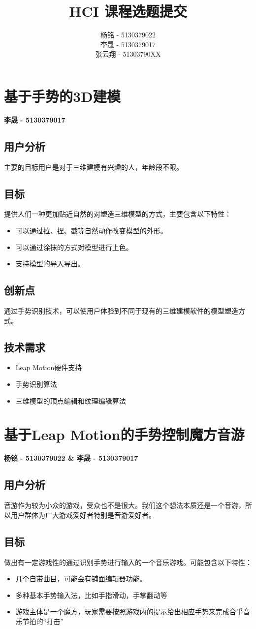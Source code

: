 \documentclass{article} \usepackage{CJK}
\author{杨铭 - 5130379022\\
        李晟 - 5130379017\\
        张云翔 - 51303790XX}
\title{HCI 课程选题提交}
\begin{document}
\maketitle
\newpage
\section{基于手势的3D建模}
\textbf{李晟 - 5130379017}
\subsection{用户分析}
主要的目标用户是对于三维建模有兴趣的人，年龄段不限。
\subsection{目标}
提供人们一种更加贴近自然的对塑造三维模型的方式，主要包含以下特性：
\begin{itemize}
	\item 可以通过拉、捏、戳等自然动作改变模型的外形。
	\item 可以通过涂抹的方式对模型进行上色。
	\item 支持模型的导入导出。
\end{itemize}
\subsection{创新点}
通过手势识别技术，可以使用户体验到不同于现有的三维建模软件的模型塑造方式。
\subsection{技术需求}
\begin{itemize}
	\item Leap Motion硬件支持
	\item 手势识别算法
	\item 三维模型的顶点编辑和纹理编辑算法
\end{itemize}
\newpage
\section{基于Leap Motion的手势控制魔方音游}
\textbf{杨铭 - 5130379022 \& 李晟 - 5130379017}
\subsection{用户分析}
音游作为较为小众的游戏，受众也不是很大。我们这个想法本质还是一个音游，所以用户群体为广大游戏爱好者特别是音游爱好者。
\subsection{目标}
做出有一定游戏性的通过识别手势进行输入的一个音乐游戏。可能包含以下特性：
\begin{itemize}
  \item 几个自带曲目，可能会有铺面编辑器功能。
  \item 多种基本手势输入法，比如手指滑动，手掌翻动等
  \item 游戏主体是一个魔方，玩家需要按照游戏内的提示给出相应手势来完成合乎音乐节拍的“打击”
\end{itemize}
\end{document}

